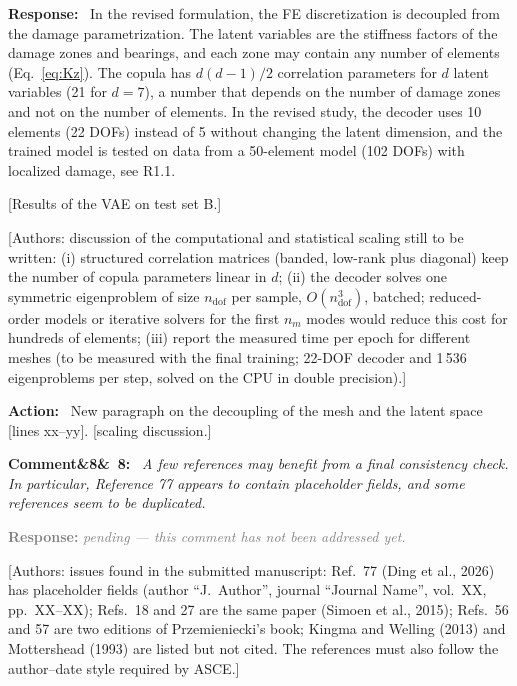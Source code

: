 \documentclass[11pt]{article}
\newenvironment{rcomment}[1]{\par\bigskip\noindent\textbf{Comment\ifx&#1&\else\ #1\fi:}\ \itshape}{\par}
\newenvironment{response}{\par\smallskip\noindent\color{resp}\textbf{Response:}\ }{\par}
\newenvironment{action}{\par\smallskip\noindent\color{resp}\textbf{Action:}\ }{\par}
\newcommand{\pending}{\par\smallskip\noindent\textcolor{gray}{\textbf{Response:} \textit{pending --- this comment
has not been addressed yet.}}\par}
\newcommand{\authornote}[1]{\textcolor{note}{\textsf{[Authors: #1]}}}
\newcommand{\tbd}[1]{\textcolor{note}{\textsf{[#1]}}}
\newcommand{\lines}[1]{\tbd{lines #1}}
\begin{document}
\begin{response}
In the revised formulation, the FE discretization is decoupled from the damage parametrization. The latent variables
are the stiffness factors of the damage zones and bearings, and each zone may contain any number of elements
(Eq.~\eqref{eq:Kz}). The copula has $d(d-1)/2$ correlation parameters for $d$ latent variables (21 for $d=7$), a number
that depends on the number of damage zones and not on the number of elements. In the revised study, the decoder uses 10
elements (22 DOFs) instead of 5 without changing the latent dimension, and the trained model is tested on data from a
50-element model (102 DOFs) with localized damage, see R1.1.

\tbd{Results of the VAE on test set B.}
\end{response}
\authornote{discussion of the computational and statistical scaling still to be written: (i) structured correlation
matrices (banded, low-rank plus diagonal) keep the number of copula parameters linear in $d$; (ii) the decoder solves
one symmetric eigenproblem of size $n_{\mathrm{dof}}$ per sample, $O(n_{\mathrm{dof}}^3)$, batched; reduced-order
models or iterative solvers for the first $n_m$ modes would reduce this cost for hundreds of elements; (iii) report the
measured time per epoch for different meshes (to be measured with the final training; 22-DOF decoder and 1\,536
eigenproblems per step, solved on the CPU in double precision).}

\begin{action}
New paragraph on the decoupling of the mesh and the latent space \lines{xx--yy}. \tbd{scaling discussion.}
\end{action}

\begin{rcomment}{8}
A few references may benefit from a final consistency check. In particular, Reference 77 appears to contain placeholder
fields, and some references seem to be duplicated.
\end{rcomment}
\pending
\authornote{issues found in the submitted manuscript: Ref.~77 (Ding et al., 2026) has placeholder fields (author
``J.~Author'', journal ``Journal Name'', vol.~XX, pp.~XX--XX); Refs.~18 and 27 are the same paper (Simoen et al., 2015);
Refs.~56 and 57 are two editions of Przemieniecki's book; Kingma and Welling (2013) and Mottershead (1993) are listed but
not cited. The references must also follow the author--date style required by ASCE.}
\end{document}
